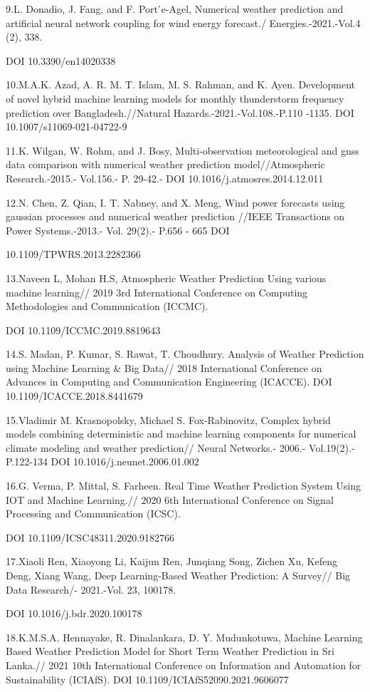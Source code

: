 \begin{noparindent}
9.L. Donadio, J. Fang, and F. Port ́e-Agel, Numerical weather prediction
and artificial neural network coupling for wind energy forecast./
Energies.-2021.-Vol.4 (2), 338.

DOI 10.3390/en14020338

10.M.A.K. Azad, A. R. M. T. Islam, M. S. Rahman, and K. Ayen.
Development of novel hybrid machine learning models for monthly
thunderstorm frequency prediction over Bangladesh.//Natural
Hazards.-2021.-Vol.108.-P.110 -1135. DOI 10.1007/s11069-021-04722-9

11.K. Wilgan, W. Rohm, and J. Bosy, Multi-observation meteorological and
gnss data comparison with numerical weather prediction
model//Atmospheric Research.-2015.- Vol.156.- P. 29-42.- DOI
10.1016/j.atmosres.2014.12.011

12.N. Chen, Z. Qian, I. T. Nabney, and X. Meng, Wind power forecasts
using gaussian processes and numerical weather prediction //IEEE
Transactions on Power Systems.-2013.- Vol. 29(2).- P.656 - 665 DOI

10.1109/TPWRS.2013.2282366

13.Naveen L, Mohan H.S, Atmospheric Weather Prediction Using various
machine learning// 2019 3rd International Conference on Computing
Methodologies and Communication (ICCMC).

DOI 10.1109/ICCMC.2019.8819643

14.S. Madan, P. Kumar, S. Rawat, T. Choudhury. Analysis of Weather
Prediction using Machine Learning \& Big Data// 2018 International
Conference on Advances in Computing and Communication Engineering
(ICACCE). DOI 10.1109/ICACCE.2018.8441679

15.Vladimir M. Krasnopolsky, Michael S. Fox-Rabinovitz, Complex hybrid
models combining deterministic and machine learning components for
numerical climate modeling and weather prediction// Neural Networks.-
2006.- Vol.19(2).- P.122-134 DOI 10.1016/j.neunet.2006.01.002

16.G. Verma, P. Mittal, S. Farheen. Real Time Weather Prediction System
Using IOT and Machine Learning.// 2020 6th International Conference on
Signal Processing and Communication (ICSC).

DOI 10.1109/ICSC48311.2020.9182766

17.Xiaoli Ren, Xiaoyong Li, Kaijun Ren, Junqiang Song, Zichen Xu, Kefeng
Deng, Xiang Wang, Deep Learning-Based Weather Prediction: A Survey// Big
Data Research/- 2021.-Vol. 23, 100178.

DOI 10.1016/j.bdr.2020.100178

18.K.M.S.A. Hennayake, R. Dinalankara, D. Y. Mudunkotuwa, Machine
Learning Based Weather Prediction Model for Short Term Weather
Prediction in Sri Lanka.// 2021 10th International Conference on
Information and Automation for Sustainability (ICIAfS). DOI
10.1109/ICIAfS52090.2021.9606077
\end{noparindent}

